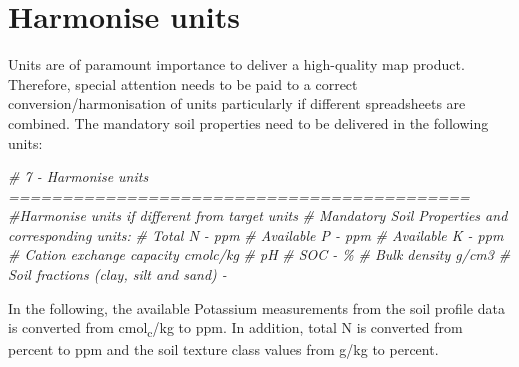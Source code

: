 \documentclass[
  10pt,
  b5paper,
  oneside]{book}
\newenvironment{Shaded}{\begin{snugshade}}{\end{snugshade}}
\newcommand{\CommentTok}[1]{\textcolor[rgb]{0.56,0.35,0.01}{\textit{#1}}}
\begin{document}
\hypertarget{harmonise-units}{%
\section{Harmonise units}\label{harmonise-units}}

Units are of paramount importance to deliver a high-quality map product. Therefore, special attention needs to be paid to a correct conversion/harmonisation of units particularly if different spreadsheets are combined. The mandatory soil properties need to be delivered in the following units:

\begin{Shaded}
\begin{Highlighting}[]
\CommentTok{\# 7 {-} Harmonise units ===========================================}
\CommentTok{\#Harmonise units if different from target units}
\CommentTok{\# Mandatory Soil Properties and corresponding units:}
\CommentTok{\# Total N {-} ppm}
\CommentTok{\# Available P {-} ppm}
\CommentTok{\# Available K {-} ppm}
\CommentTok{\# Cation exchange capacity cmolc/kg}
\CommentTok{\# pH}
\CommentTok{\# SOC {-} \%}
\CommentTok{\# Bulk density g/cm3}
\CommentTok{\# Soil fractions (clay, silt and sand) {-} }
\end{Highlighting}
\end{Shaded}

In the following, the available Potassium measurements from the soil profile data is converted from cmol\textsubscript{c}/kg to ppm. In addition, total N is converted from percent to ppm and the soil texture class values from g/kg to percent.
\end{document}
